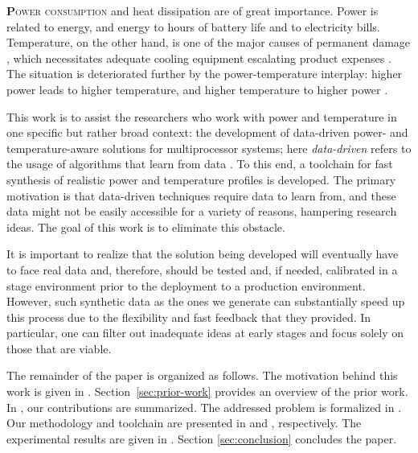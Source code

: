 \lettrine[findent=0.3em, nindent=0em]{\textbf{P}}{ower consumption} and heat
dissipation are of great importance. Power is related to energy, and energy to
hours of battery life and to electricity bills. Temperature, on the other hand,
is one of the major causes of permanent damage \cite{jedec}, which necessitates
adequate cooling equipment escalating product expenses \cite{chaudhry2015}. The
situation is deteriorated further by the power-temperature interplay: higher
power leads to higher temperature, and higher temperature to higher power
\cite{liu2007}.

This work is to assist the researchers who work with power and temperature in
one specific but rather broad context: the development of data-driven power- and
temperature-aware solutions for multiprocessor systems; here \emph{data-driven}
refers to the usage of algorithms that learn from data \cite{bishop2006}. To
this end, a toolchain for fast synthesis of realistic power and temperature
profiles is developed. The primary motivation is that data-driven techniques
require data to learn from, and these data might not be easily accessible for a
variety of reasons, hampering research ideas. The goal of this work is to
eliminate this obstacle.

It is important to realize that the solution being developed will eventually
have to face real data and, therefore, should be tested and, if needed,
calibrated in a stage environment prior to the deployment to a production
environment. However, such synthetic data as the ones we generate can
substantially speed up this process due to the flexibility and fast feedback
that they provided. In particular, one can filter out inadequate ideas at early
stages and focus solely on those that are viable.

The remainder of the paper is organized as follows. The motivation behind this
work is given in . Section~\ref{sec:prior-work} provides an
overview of the prior work. In , our contributions are
summarized. The addressed problem is formalized in .
Our methodology and toolchain are presented in  and
, respectively. The experimental results are given in
. Section \ref{sec:conclusion} concludes the paper.
